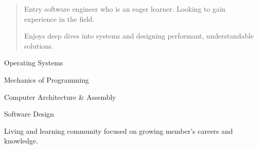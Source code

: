   \begin{quote}
    Entry software engineer who is an eager learner. Looking to gain experience in the field. \par
    Enjoys deep dives into systems and designing performant, understandable solutions.
  \end{quote}


  \smallskip{}

  \smallskip{}
  \cvtag{\LaTeX}
  
  Operating Systems \par
  Mechanics of Programming \par
  Computer Architecture \& Assembly \par
  Software Design


  Living and learning community focused on growing member's careers and knowledge.

